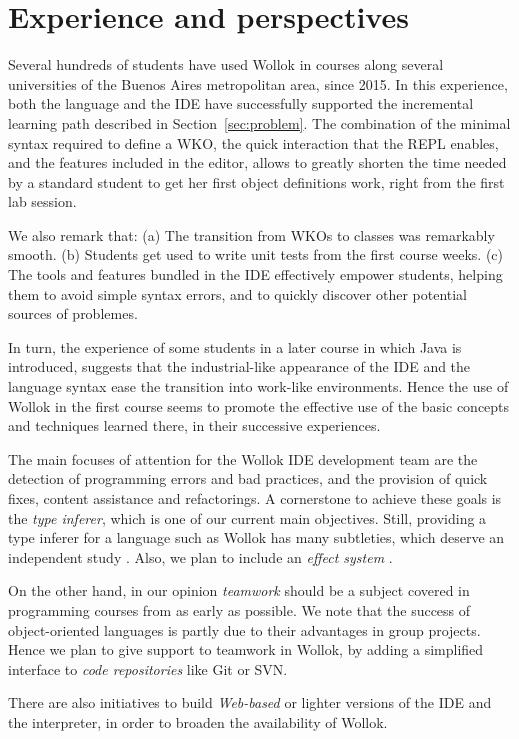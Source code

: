 \section{Experience and perspectives}
\label{sec:experience-perspectives}

Several hundreds of students have used Wollok in courses along several universities of the Buenos Aires metropolitan area, since 2015.
In this experience, both the language and the IDE have successfully supported the incremental learning path described in Section~\ref{sec:problem}.
The combination of the minimal syntax required to define a WKO, the quick interaction that the REPL enables, and the features included in the editor, allows to greatly shorten the time needed by a standard student to get her first object definitions work, right from the first lab session.

We also remark that:
(a) The transition from WKOs to classes was remarkably smooth.
(b) Students get used to write unit tests from the first course weeks.
(c) The tools and features bundled in the IDE effectively empower students, helping them to avoid simple syntax errors, and to quickly discover other potential sources of problemes.

In turn, the experience of some students in a later course in which Java is introduced, suggests that the industrial-like appearance of the IDE and the language syntax ease the transition into work-like environments. Hence the use of Wollok in the first course seems to promote the effective use of the basic concepts and techniques learned there, in their successive experiences.

\medskip
The main focuses of attention for the Wollok IDE development team are the detection of programming errors and bad practices, and the provision of quick fixes, content assistance and refactorings.
A cornerstone to achieve these goals is the \emph{type inferer}, which is one of our current main objectives.
Still, providing a type inferer for a language such as Wollok has many subtleties, which deserve an independent study \cite{passerini_nicolas_extensible_2014}.
Also, we plan to include an \emph{effect system} \cite{nielson_type_1999}.

On the other hand, in our opinion \emph{teamwork} should be a subject covered in programming courses from as early as possible. We note that the success of object-oriented languages is partly due to their advantages in group projects. 
Hence we plan to give support to teamwork in Wollok, by adding a simplified interface to \emph{code repositories} like Git or SVN.

There are also initiatives to build \emph{Web-based} or lighter versions of the IDE and the interpreter, in order to broaden the availability of Wollok.
























